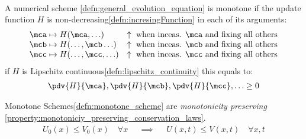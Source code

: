 \begin{defnbox}\nospacing
    \begin{defn}\label{defn:monotone_scheme}\leavevmode\\
        A numerical scheme \cref{defn:general_evolution_equation} is monotone if the update function $H$ is non-decreasing\cref{defn:incresingFunction} in each of its arguments:
        \begin{align}
          &\mca\mapsto H(\mca,\ldots)&\uparrow\text{ when inceas. $\mca$ and fixing all others}\nonumber\\[-1\jot]
          &\mcb\mapsto H(\ldots,\mcb\ldots)&\uparrow\text{ when inceas. $\mcb$ and fixing all others}\nonumber\\[-1\jot]
          &\mcc\mapsto H(\ldots,\mcc,\ldots)&\uparrow\text{ when inceas. $\mcc$ and fixing all others}\label{eq:monotone_scheme}
        \end{align}
        if $H$ is Lipschitz continuous\cref{defn:lipschitz_continuity} this equals to:\
        \begin{align}
          \pdv{H}{\mca},\pdv{H}{\mcb},\pdv{H}{\mcc},\ldots\geq0
        \end{align}
    \end{defn}
\end{defnbox}
\begin{corbox}\nospacing
    \begin{cor}\label{cor:monotone_schemes_and_monotonicity}
        Monotone Schemes\cref{defn:monotone_scheme} are \textit{monotonicity preserving} \cref{property:monotoniciy_preserving_conservation_laws}.
        \begin{align}
          U_{0}(x)\leq V_{0}(x)\quad\forall x&&\implies&& U(x,t)\leq V(x,t)\quad\forall x,t
        \end{align}
    \end{cor}
\end{corbox}
